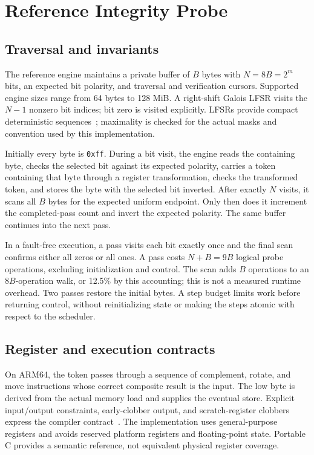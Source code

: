 \documentclass[10pt,twocolumn,letterpaper]{article}
\newcommand{\code}[1]{\texttt{#1}}
\begin{document}
\section{Reference Integrity Probe}
\subsection{Traversal and invariants}
The reference engine maintains a private buffer of $B$ bytes with $N=8B=2^m$ bits, an expected bit polarity, and traversal and verification cursors. Supported engine sizes range from 64 bytes to 128 MiB. A right-shift Galois LFSR visits the $N-1$ nonzero bit indices; bit zero is visited explicitly. LFSRs provide compact deterministic sequences~\cite{alfke1996}; maximality is checked for the actual masks and convention used by this implementation.

Initially every byte is \code{0xff}. During a bit visit, the engine reads the containing byte, checks the selected bit against its expected polarity, carries a token containing that byte through a register transformation, checks the transformed token, and stores the byte with the selected bit inverted. After exactly $N$ visits, it scans all $B$ bytes for the expected uniform endpoint. Only then does it increment the completed-pass count and invert the expected polarity. The same buffer continues into the next pass.

In a fault-free execution, a pass visits each bit exactly once and the final scan confirms either all zeros or all ones. A pass costs $N+B=9B$ logical probe operations, excluding initialization and control. The scan adds $B$ operations to an $8B$-operation walk, or 12.5\% by this accounting; this is not a measured runtime overhead. Two passes restore the initial bytes. A step budget limits work before returning control, without reinitializing state or making the steps atomic with respect to the scheduler.

\subsection{Register and execution contracts}
On ARM64, the token passes through a sequence of complement, rotate, and move instructions whose correct composite result is the input. The low byte is derived from the actual memory load and supplies the eventual store. Explicit input/output constraints, early-clobber output, and scratch-register clobbers express the compiler contract~\cite{gcc}. The implementation uses general-purpose registers and avoids reserved platform registers and floating-point state. Portable C provides a semantic reference, not equivalent physical register coverage.
\end{document}
